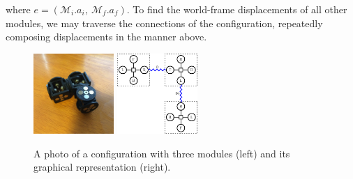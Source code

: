 \documentclass[graybox]{svmult}
\begin{document}
\begin{definition}[Configuration]
where \(e=(\mathcal{M}_i.a_i,~\mathcal{M}_f.a_f)\). To find the world-frame displacements
of all other modules, we may traverse the connections of the configuration,  repeatedly
composing displacements in the manner above. 
\end{definition}

\begin{figure}
\sidecaption
\includegraphics[height=1.2in]{images/smores_conf.JPG}
\includegraphics[height=1.2in]{images/tikz/smores_conf.pdf}
\caption{A photo of a configuration with three modules (left) and its graphical representation (right).}
\label{fig:smores_conf}
\end{figure}
\end{document}
